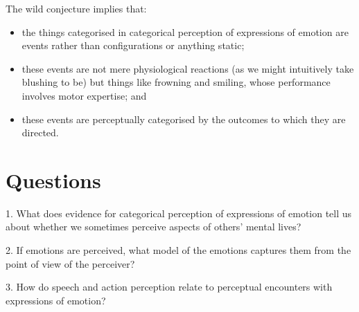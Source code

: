 \documentclass[12pt]{extarticle}
\begin{document}
\begin{multicols*}{3}
The wild conjecture implies that:
\begin{itemize}
 \item the things categorised in categorical perception of expressions of emotion are events rather than configurations or anything static;
\item  these events are not mere physiological reactions (as we might intuitively take blushing to be) but things like frowning and smiling, whose performance involves motor expertise; and
\item  these events are perceptually categorised  by the outcomes to which they are directed.
\end{itemize}

\section{Questions}

1. What does evidence for categorical perception of expressions of emotion tell us about whether we sometimes perceive aspects of others’ mental lives?

2. If emotions are perceived, what model of the emotions captures them from the point of view of the perceiver?

3. How do speech and action perception relate to perceptual encounters with expressions of emotion?



\footnotesize


\end{multicols*}
\end{document}
